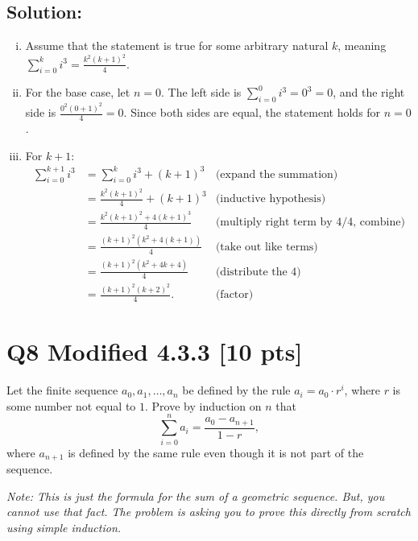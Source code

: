 \documentclass[12pt]{article}
\begin{document}
	\subsection*{\textbf{Solution:}}
	\begin{enumerate}[(i)]
		\item Assume that the statement is true for some arbitrary natural $k$,
			meaning $\sum_{i=0}^{k}i^{3}=\frac{k^{2}(k+1)^{2}}{4}$.

		\item For the base case, let $n=0$. The left side is $\sum_{i=0}^{0}i^{3}=0^{3}
			=0$, and the right side is $\frac{0^{2}(0+1)^{2}}{4}=0$. Since both sides are
			equal, the statement holds for $n=0$.

		\item For $k+1$:
			\[
				\begin{aligned}
					\sum_{i=0}^{k+1}i^{3} & =\sum_{i=0}^{k}i^{3}+(k+1)^{3}  & \text{(expand the summation)}                \\
					                      & =\frac{k^2(k+1)^2}{4}+(k+1)^{3} & \text{(inductive hypothesis)}                \\
					                      & =\frac{k^2(k+1)^2+4(k+1)^3}{4}  & \text{(multiply right term by 4/4, combine)} \\
					                      & =\frac{(k+1)^2(k^2+4(k+1))}{4}  & \text{(take out like terms)}                 \\
					                      & =\frac{(k+1)^2(k^2+4k+4)}{4}    & \text{(distribute the 4)}                    \\
					                      & =\frac{(k+1)^2(k+2)^2}{4}.      & \text{(factor)}
				\end{aligned}
			\]
	\end{enumerate}

	\newpage

	\section*{Q8 Modified 4.3.3 [10 pts]}

	Let the finite sequence $a_{0},a_{1},\ldots,a_{n}$ be defined by the rule $a_{i}
	= a_{0} \cdot r^{i}$, where $r$ is some number not equal to $1.$ Prove by
	induction on $n$ that
	\[
		\sum_{i=0}^{n} a_{i} = \frac{a_{0}- a_{n+1}}{1-r},
	\]
	where $a_{n+1}$ is defined by the same rule even though it is not part of the
	sequence.

	\medskip

	{\em \small Note: This is just the formula for the sum of a geometric sequence. But, you cannot use that fact. The problem is asking you to prove this directly from scratch using simple induction.}
\end{document}
